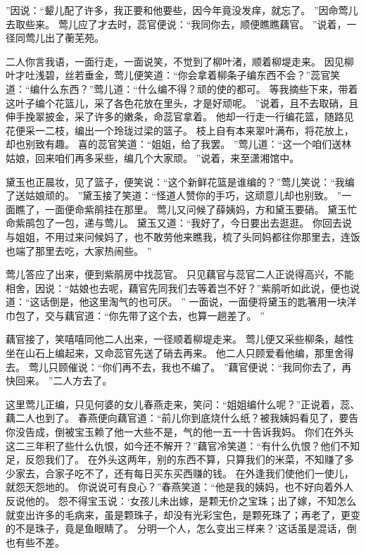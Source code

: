 ”因说：“颦儿配了许多，我正要和他要些，因今年竟没发痒，就忘了。
”因命莺儿去取些来。
莺儿应了才去时，蕊官便说：“我同你去，顺便瞧瞧藕官。
”说着，一径同莺儿出了蘅芜苑。
\par
二人你言我语，一面行走，一面说笑，不觉到了柳叶渚，顺着柳堤走来。
因见柳叶才吐浅碧，丝若垂金，莺儿便笑道：“你会拿着柳条子编东西不会？”蕊官笑道：“编什么东西？”莺儿道：“什么编不得？顽的使的都可。
等我摘些下来，带着这叶子编个花篮儿，采了各色花放在里头，才是好顽呢。
”说着，且不去取硝，且伸手挽翠披金，采了许多的嫩条，命蕊官拿着。
他却一行走一行编花篮，随路见花便采一二枝，编出一个玲珑过梁的篮子。
枝上自有本来翠叶满布，将花放上，却也别致有趣。
喜的蕊官笑道：“姐姐，给了我罢。
”莺儿道：“这一个咱们送林姑娘，回来咱们再多采些，编几个大家顽。
”说着，来至潇湘馆中。
\par
黛玉也正晨妆，见了篮子，便笑说：“这个新鲜花篮是谁编的？”莺儿笑说：“我编了送姑娘顽的。
”黛玉接了笑道：“怪道人赞你的手巧，这顽意儿却也别致。
”一面瞧了，一面便命紫鹃挂在那里。
莺儿又问候了薛姨妈，方和黛玉要硝。
黛玉忙命紫鹃包了一包，递与莺儿。
黛玉又道：“我好了，今日要出去逛逛。
你回去说与姐姐，不用过来问候妈了，也不敢劳他来瞧我，梳了头同妈都往你那里去，连饭也端了那里去吃，大家热闹些。
”\par
莺儿答应了出来，便到紫鹃房中找蕊官。
只见藕官与蕊官二人正说得高兴，不能相舍，因说：“姑娘也去呢，藕官先同我们去等着岂不好？”紫鹃听如此说，便也说道：“这话倒是，他这里淘气的也可厌。
”
一面说，一面便将黛玉的匙箸用一块洋巾包了，交与藕官道：“你先带了这个去，也算一趟差了。
”\par
藕官接了，笑嘻嘻同他二人出来，一径顺着柳堤走来。
莺儿便又采些柳条，越性坐在山石上编起来，又命蕊官先送了硝去再来。
他二人只顾爱看他编，那里舍得去。
莺儿只顾催说：“你们再不去，我也不编了。
”藕官便说：“我同你去了，再快回来。
”二人方去了。
\par
这里莺儿正编，只见何婆的女儿春燕走来，笑问：“姐姐编什么呢？”正说着，蕊、藕二人也到了。
春燕便向藕官道：“前儿你到底烧什么纸？被我姨妈看见了，要告你没告成，倒被宝玉赖了他一大些不是，气的他一五一十告诉我妈。
你们在外头这二三年积了些什么仇恨，如今还不解开？”藕官冷笑道：“有什么仇恨？他们不知足，反怨我们了。
在外头这两年，别的东西不算，只算我们的米菜，不知赚了多少家去，合家子吃不了，还有每日买东买西赚的钱。
在外逢我们使他们一使儿，就怨天怨地的。
你说说可有良心？”春燕笑道：“他是我的姨妈，也不好向着外人反说他的。
怨不得宝玉说：‘女孩儿未出嫁，是颗无价之宝珠；出了嫁，不知怎么就变出许多的毛病来，虽是颗珠子，却没有光彩宝色，是颗死珠了；再老了，更变的不是珠子，竟是鱼眼睛了。
分明一个人，怎么变出三样来？’这话虽是混话，倒也有些不差。
